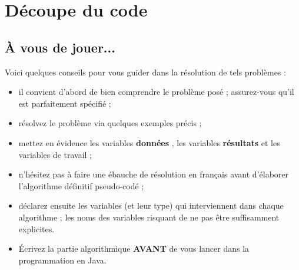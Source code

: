 \documentclass[11pt,a4paper]{article}
\begin{document}
            \begin{abstract}
			Ces exercices ont pour but de v\'erifier que vous avez fix\'e comment d\'ecouper un algorithme,
			comment lancer une exception et documenter votre code.
		
            \par
        \end{abstract}
				\vspace{-2em}\tableofcontents
				\pagestyle{plain}
            \clearpage
            \fancyhead[L,C,R]{}
            \fancyfoot[L,C]{}
            \fancyfoot[R]{ \scriptsize{\textcolor{gray}{
				InitModule - page \thepage}}}
				\thispagestyle{fancy}
				\pagestyle{fancy}
	   
            \section{D\'ecoupe du code}\subsection{\`A vous de jouer...}
          Voici quelques conseils pour vous guider dans la r\'esolution de tels probl\`emes :
          
					\begin{itemize}
				
			\item il convient d'abord de bien comprendre le probl\`eme pos\'e ; assurez-vous qu'il est parfaitement sp\'ecifi\'e ;
			\item r\'esolvez le probl\`eme via quelques exemples pr\'ecis ;
			\item mettez en \'evidence les variables \textbf{\guillemotleft  donn\'ees \guillemotright }, les variables \textbf{\guillemotleft  r\'esultats \guillemotright } et les variables de travail ;
			\item n'h\'esitez pas \`a faire une \'ebauche de r\'esolution en fran\c cais avant d'\'elaborer l'algorithme d\'efinitif pseudo-cod\'e ;
			\item d\'eclarez ensuite les variables (et leur type) qui interviennent dans chaque algorithme ; les noms des variables risquant de ne pas \^etre suffisamment explicites.
			\item \'Ecrivez la partie algorithmique \textbf{AVANT} de vous lancer dans la programmation en Java.
					\end{itemize}
				
            \par
        
\end{document}
